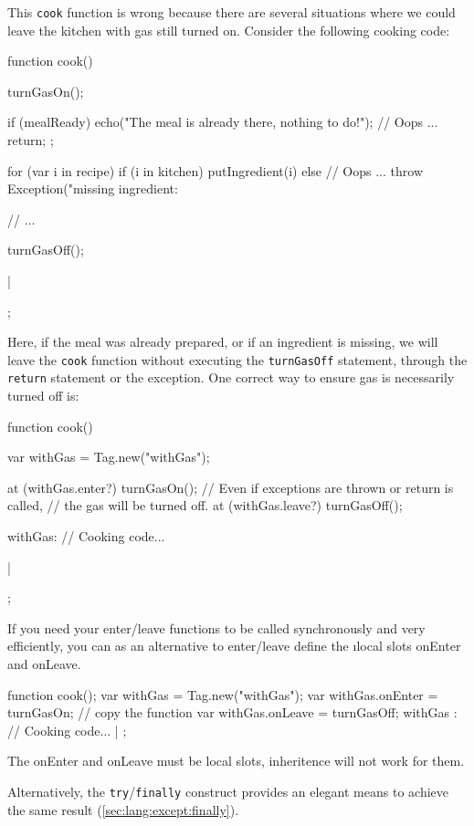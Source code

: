 This \lstinline|cook| function is wrong because there are several situations
where we could leave the kitchen with gas still turned on. Consider the
following cooking code:

\begin{urbiscript}
{
  function cook()
  {
    turnGasOn();

    if (mealReady)
    {
      echo("The meal is already there, nothing to do!");
      // Oops ...
      return;
    };

    for (var i in recipe)
      if (i in kitchen)
        putIngredient(i)
      else
        // Oops ...
        throw Exception("missing ingredient: %

    // ...

    turnGasOff();
  }|
};
\end{urbiscript}

Here, if the meal was already prepared, or if an ingredient is missing, we
will leave the \lstinline|cook| function without executing the
\lstinline|turnGasOff| statement, through the \lstinline|return| statement
or the exception.  One correct way to ensure gas is necessarily turned off
is:

\begin{urbiscript}
{
  function cook()
  {
    var withGas = Tag.new("withGas");

    at (withGas.enter?)
      turnGasOn();
    // Even if exceptions are thrown or return is called,
    // the gas will be turned off.
    at (withGas.leave?)
      turnGasOff();

    withGas: {
      // Cooking code...
    }
  }|
};
\end{urbiscript}

If you need your enter/leave functions to be called synchronously and very
efficiently, you can as an alternative to enter/leave define the {\i local} slots
onEnter and onLeave.

\begin{urbiscript}
{
  function cook();
  var withGas = Tag.new("withGas");
  var withGas.onEnter = turnGasOn; // copy the function
  var withGas.onLeave = turnGasOff;
  withGas : {
    // Cooking code...
  }|
};
\end{urbiscript}

The onEnter and onLeave must be local slots, inheritence will not work for them.

Alternatively, the \lstinline|try|/\lstinline|finally| construct provides an
elegant means to achieve the same result (\autoref{sec:lang:except:finally}).

